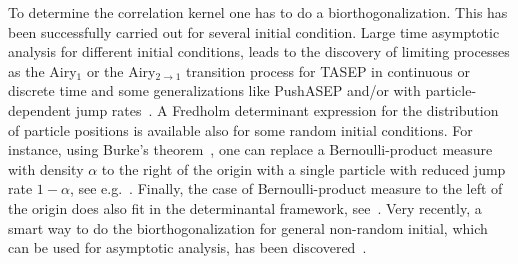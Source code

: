 \documentclass[12pt,a4paper]{article}
\numberwithin{equation}{section}
\begin{document}
To determine the correlation kernel one has to do a biorthogonalization. This has been successfully carried out for several initial condition. Large time asymptotic analysis for different initial conditions, leads to the discovery of limiting processes as the Airy$_1$ or the Airy$_{2\to 1}$ transition process for TASEP in continuous or discrete time and some generalizations like PushASEP and/or with particle-dependent jump rates~\cite{Sas07,BFPS06,BFP06,BF07,BFS07b}. A Fredholm determinant expression for the distribution of particle positions is available also for some random initial conditions. For instance, using Burke's theorem~\cite{Bur56}, one can replace a Bernoulli-product measure with density $\alpha$ to the right of the origin with a single particle with reduced jump rate $1-\alpha$, see e.g.~\cite{PS01}. Finally, the case of Bernoulli-product measure to the left of the origin does also fit in the determinantal framework, see~\cite{FSW15}. Very recently, a smart way to do the biorthogonalization for general non-random initial, which can be used for asymptotic analysis, has been discovered~\cite{MQR17}.
\end{document}
